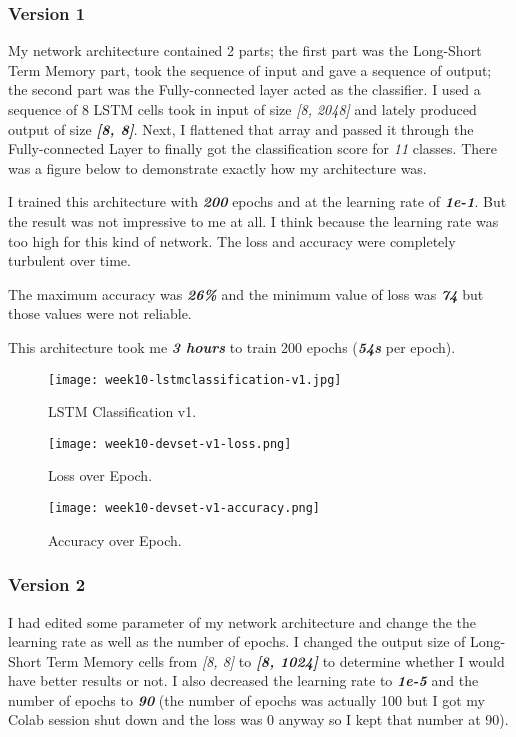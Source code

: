 \subsubsection{Version 1}
My network architecture contained 2 parts; the first part was the Long-Short Term Memory part, took the sequence of input and gave a sequence of output; the second part was the Fully-connected layer acted as the classifier. I used a sequence of 8 LSTM cells took in input of size \emph{[8, 2048]} and lately produced output of size \textbf{\emph{[8, 8]}}. Next, I flattened that array and passed it through the Fully-connected Layer to finally got the classification score for \emph{11} classes. There was a figure below to demonstrate exactly how my architecture was.

I trained this architecture with \textbf{\emph{200}} epochs and at the learning rate of \textbf{\emph{1e-1}}. But the result was not impressive to me at all. I think because the learning rate was too high for this kind of network. The loss and accuracy were completely turbulent over time.

The maximum accuracy was \textbf{\emph{26\%}} and the minimum value of loss was \textbf{\emph{74}} but those values were not reliable.

This architecture took me \textbf{\emph{3 hours}} to train 200 epochs (\textbf{\emph{54s}} per epoch).

\begin{figure}[!ht]
\centering
\texttt{[image: week10-lstmclassification-v1.jpg]}
\caption{LSTM Classification v1.}
\end{figure}

\begin{figure}[!ht]
\centering
\texttt{[image: week10-devset-v1-loss.png]}
\caption{Loss over Epoch.}
\end{figure}

\newpage
\begin{figure}[!ht]
\centering
\texttt{[image: week10-devset-v1-accuracy.png]}
\caption{Accuracy over Epoch.}
\end{figure}

\subsubsection{Version 2}
I had edited some parameter of my network architecture and change the the learning rate as well as the number of epochs. I changed the output size of Long-Short Term Memory cells from \emph{[8, 8]} to \textbf{\emph{[8, 1024]}} to determine whether I would have better results or not. I also decreased the learning rate to \textbf{\emph{1e-5}} and the number of epochs to \textbf{\emph{90}} (the number of epochs was actually 100 but I got my Colab session shut down and the loss was 0 anyway so I kept that number at 90).

